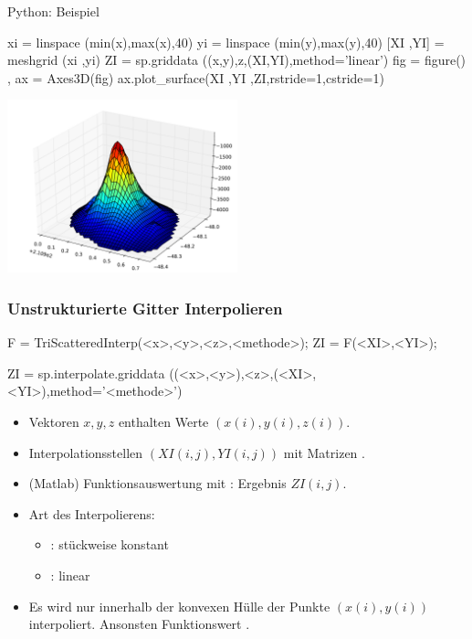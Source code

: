 \documentclass[hyperref={xetex}]{beamer}
\begin{document}
\begin{frame}[fragile]{Python: Beispiel}
\begin{pyin}
xi = linspace (min(x),max(x),40)
yi = linspace (min(y),max(y),40)
[XI ,YI] = meshgrid (xi ,yi)
ZI = sp.griddata ((x,y),z,(XI,YI),method='linear')
fig = figure() , ax = Axes3D(fig)
ax.plot_surface(XI ,YI ,ZI,rstride=1,cstride=1) 
\end{pyin}
\begin{center}
\includegraphics[width=0.5\textwidth]{figures/scattered_data_plot_py}
\end{center}
\end{frame}
%
% 
\begin{frame}[fragile]\frametitle{Unstrukturierte Gitter Interpolieren}
\begin{matlabin}
F = TriScatteredInterp(<x>,<y>,<z>,<methode>);
ZI = F(<XI>,<YI>);
\end{matlabin}
\begin{pyin}
ZI = sp.interpolate.griddata ((<x>,<y>),<z>,(<XI>,<YI>),method='<methode>')  
\end{pyin}
\begin{itemize}
\item Vektoren $x,y,z$ enthalten Werte $(x(i),y(i),z(i))$.
\item Interpolationsstellen $(XI(i,j),YI(i,j))$ mit Matrizen . 
\item (Matlab) Funktionsauswertung mit : Ergebnis $ZI(i,j)$.
\item Art des Interpolierens:
\begin{itemize}
 \item {}: st\"uckweise konstant
 \item {}: linear
\end{itemize}
\item Es wird nur innerhalb der konvexen H\"ulle der Punkte $(x(i),y(i))$
  interpoliert. Ansonsten Funktionswert . 
\end{itemize}
\end{frame}
\end{document}
